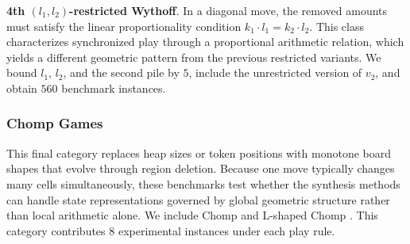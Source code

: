 \documentclass[review]{elsarticle}
\newcommand{\set}[1]{\{ #1 \}}
\newcommand{\tuple}[1]{\langle {#1} \rangle}
\newcommand{\true}{\top}
\newcommand{\statevar}{\mathcal{X}}
\newcommand{\act}{\mathcal{A}}
\newcommand{\constraint}{\mathcal{C}}
\newcommand{\estate}{\mathcal{E}}
\newcommand{\pre}{\mathtt{pre}}
\newcommand{\eff}{\mathtt{eff}}
\begin{document}
\textbf{4th $(l_1,l_2)$-restricted Wythoff}. In a diagonal move, the removed amounts must satisfy the linear proportionality condition $k_1 \cdot l_1 = k_2 \cdot l_2$.
This class characterizes synchronized play through a proportional arithmetic relation, which yields a different geometric pattern from the previous restricted variants.
We bound $l_1$, $l_2$, and the second pile by $5$, include the unrestricted version of $v_2$, and obtain $560$ benchmark instances.

\subsubsection{Chomp Games}
This final category replaces heap sizes or token positions with monotone board shapes that evolve through region deletion.
Because one move typically changes many cells simultaneously, these benchmarks test whether the synthesis methods can handle state representations governed by global geometric structure rather than local arithmetic alone.
We include Chomp \cite{Sch1952} and L-shaped Chomp \cite{Sch1952}.
This category contributes $8$ experimental instances under each play rule.
\end{document}
